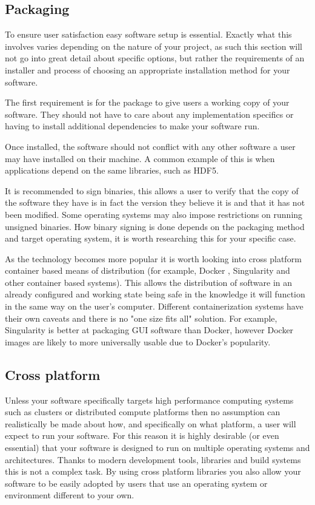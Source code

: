 \documentclass[jnr]{iosart2x}
\begin{document}
\begin{itemzie}
\subsection{Packaging}
\label{Packaging}

To ensure user satisfaction easy software setup is essential.
Exactly what this involves varies depending on the nature of your project, as such this section will not go into great detail about specific options, but rather the requirements of an installer and process of choosing an appropriate installation method for your software.

The first requirement is for the package to give users a working copy of your software.
They should not have to care about any implementation specifics or having to install additional dependencies to make your software run.

Once installed, the software should not conflict with any other software a user may have installed on their machine.
A common example of this is when applications depend on the same libraries, such as HDF5.

It is recommended to sign binaries, this allows a user to verify that the copy of the software they have is in fact the version they believe it is and that it has not been modified.
Some operating systems may also impose restrictions on running unsigned binaries.
How binary signing is done depends on the packaging method and target operating system, it is worth researching this for your specific case.

As the technology becomes more popular it is worth looking into cross platform container based means of distribution (for example, Docker \cite{Docker}, Singularity \cite{Kurtzer_2017} and other container based systems).
This allows the distribution of software in an already configured and working state being safe in the knowledge it will function in the same way on the user's computer.
Different containerization systems have their own caveats and there is no "one size fits all" solution.
For example, Singularity is better at packaging GUI software than Docker, however Docker images are likely to more universally usable due to Docker's popularity.

\subsection{Cross platform}
\label{Cross platform}

Unless your software specifically targets high performance computing systems such as clusters or distributed compute platforms then no assumption can realistically be made about how, and specifically on what platform, a user will expect to run your software.
For this reason it is highly desirable (or even essential) that your software is designed to run on multiple operating systems and architectures.
Thanks to modern development tools, libraries and build systems this is not a complex task.
By using cross platform libraries you also allow your software to be easily adopted by users that use an operating system or environment different to your own.


\end{itemzie}
\end{document}
